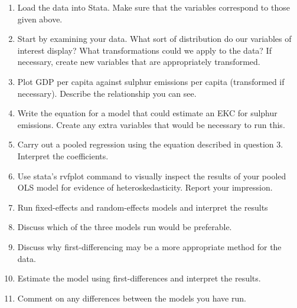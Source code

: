 \documentclass{scrartcl}
\begin{document}
	\begin{enumerate}
	\item Load the data into Stata. Make sure that the variables correspond to those given above.
	
	\item Start by examining your data. What sort of distribution do our variables of interest display? What transformations could we apply to the data? If necessary, create new variables that are appropriately transformed.
	
	\item Plot GDP per capita against sulphur emissions per capita (transformed if necessary). Describe the relationship you can see.
	
	\item Write the equation for a model that could estimate an EKC for sulphur emissions. Create any extra variables that would be necessary to run this.
	
	\item Carry out a pooled regression using the equation described in question 3. Interpret the coefficients.
	
	\item Use stata's rvfplot command to visually inspect the results of your pooled OLS model for evidence of heteroskedasticity. Report your impression.
	
	\item Run fixed-effects and random-effects models and interpret the results
	
	\item Discuss which of the three models run would be preferable.
	
	\item Discuss why first-differencing may be a more appropriate method for the data.
	
	\item Estimate the model using first-differences and interpret the results.
	
	\item Comment on any differences between the models you have run.
	
	\end{enumerate}



\end{document}
